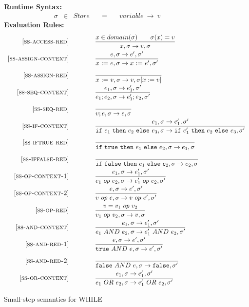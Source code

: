 \documentclass{article}
\begin{document}
\begin{figure}
\caption{Small-step semantics for WHILE}
{\bf Runtime Syntax:}
\[
\begin{array}{rclcl}
  \sigma & \in & {Store} \quad  & = & \quad {variable} ~\rightarrow ~v
\end{array}
\]
{\bf Evaluation Rules:~~~ } \\
\[
\begin{array}{r@{\qquad\qquad}l}

\ssrule{ss-access-red}{
    x \in domain(\sigma) \qquad \sigma(x)=v
}{
    \sstep{x}{\sigma}{v}{\sigma}
}

\ssrule{ss-assign-context}{
    \sstep{e}{\sigma}{e'}{\sigma'}
}{
    \sstep{\assign{x}{e}}{\sigma}{\assign{x}{e'}}{\sigma'}
}

\ssrule{ss-assign-red}{
}{
    \sstep{\assign{x}{v}}{\sigma}{v}{\sigma[x:=v]}
}

\ssrule{ss-seq-context}{
    \sstep{e_1}{\sigma}{e_1'}{\sigma'}
}{
    \sstep{e_1;e_2}{\sigma}{e_1';e_2}{\sigma'}
}

\ssrule{ss-seq-red}{
}{
  \sstep{v;e}{\sigma}{e}{\sigma}
}


\ssrule{ss-if-context}{
 \sstep{e_1}{\sigma}{e_1'}{\sigma'}
}{
  \sstep{\ife{e_1}{e_2}{e_3}}{\sigma}{\ife{e_1'}{e_2}{e_3}}{\sigma'}
}


\ssrule{ss-iftrue-red}{
}{
  \sstep{\ife{\true}{e_1}{e_2}}{\sigma}{e_1}{\sigma}
}

\ssrule{ss-iffalse-red}{
}{
  \sstep{\ife{\false}{e_1}{e_2}}{\sigma}{e_2}{\sigma}
}

\ssrule{ss-op-context-1}{
  \sstep{e_1}{\sigma}{e_1'}{\sigma'}
}{
  \sstep{e_1~op~e_2}{\sigma}{e_1'~op~e_2}{\sigma'}
}

\ssrule{ss-op-context-2}{
  \sstep{e}{\sigma}{e'}{\sigma'}
}{
  \sstep{v~op~e}{\sigma}{v~op~e'}{\sigma'}
}

\ssrule{ss-op-red}{
  v = v_1 ~op~ v_2
}{
  \sstep{v_1~op~v_2}{\sigma}{v}{\sigma}
}

\ssrule{ss-and-context}{
  \sstep{e_1}{\sigma}{e_1'}{\sigma'}
}{
  \sstep{e_1~AND~e_2}{\sigma}{e_1'~AND~e_2}{\sigma'}
}

\ssrule{ss-and-red-1}{
  \sstep{e}{\sigma}{e'}{\sigma'}
}{
  \sstep{\true~AND~e}{\sigma}{e'}{\sigma'}
}

\ssrule{ss-and-red-2}{
}{
  \sstep{\false~AND~e}{\sigma}{\false}{\sigma'}
}

\ssrule{ss-or-context}{
  \sstep{e_1}{\sigma}{e_1'}{\sigma'}
}{
  \sstep{e_1~OR~e_2}{\sigma}{e_1'~OR~e_2}{\sigma'}
}


\end{array}\]
\end{figure}
\end{document}
